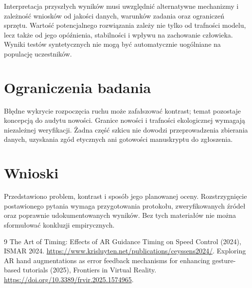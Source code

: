 \documentclass[11pt,a4paper]{article}
\begin{document}
Interpretacja przyszłych wyników musi uwzględnić alternatywne mechanizmy i zależność wniosków od jakości danych, warunków zadania oraz ograniczeń sprzętu. Wartość potencjalnego rozwiązania zależy nie tylko od trafności modelu, lecz także od jego opóźnienia, stabilności i wpływu na zachowanie człowieka. Wyniki testów syntetycznych nie mogą być automatycznie uogólniane na populację uczestników.

\section{Ograniczenia badania}

Błędne wykrycie rozpoczęcia ruchu może zafałszować kontrast; temat pozostaje koncepcją do audytu nowości. Granice nowości i trafności ekologicznej wymagają niezależnej weryfikacji. Żadna część szkicu nie dowodzi przeprowadzenia zbierania danych, uzyskania zgód etycznych ani gotowości manuskryptu do zgłoszenia.

\section{Wnioski}

Przedstawiono problem, kontrast i sposób jego planowanej oceny. Rozstrzygnięcie postawionego pytania wymaga przygotowania protokołu, zweryfikowanych źródeł oraz poprawnie udokumentowanych wyników. Bez tych materiałów nie można sformułować konkluzji empirycznych.

\begin{thebibliography}{9}
 The Art of Timing: Effects of AR Guidance Timing on Speed Control (2024), ISMAR 2024. \url{https://www.krisluyten.net/publications/ceyssens2024/}.
 Exploring AR hand augmentations as error feedback mechanisms for enhancing gesture-based tutorials (2025), Frontiers in Virtual Reality. \url{https://doi.org/10.3389/frvir.2025.1574965}.
\end{thebibliography}
\end{document}
